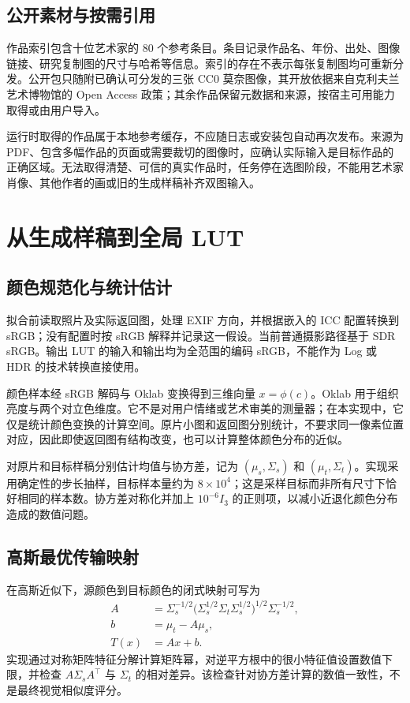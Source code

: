 \subsection{公开素材与按需引用}
作品索引包含十位艺术家的 80 个参考条目。条目记录作品名、年份、出处、图像链接、研究复制图的尺寸与哈希等信息。索引的存在不表示每张复制图均可重新分发。公开包只随附已确认可分发的三张 CC0 莫奈图像，其开放依据来自克利夫兰艺术博物馆的 Open Access 政策\cite{cma}；其余作品保留元数据和来源，按宿主可用能力取得或由用户导入。

运行时取得的作品属于本地参考缓存，不应随日志或安装包自动再次发布。来源为 PDF、包含多幅作品的页面或需要裁切的图像时，应确认实际输入是目标作品的正确区域。无法取得清楚、可信的真实作品时，任务停在选图阶段，不能用艺术家肖像、其他作者的画或旧的生成样稿补齐双图输入。

\section{从生成样稿到全局 LUT}
\subsection{颜色规范化与统计估计}
拟合前读取照片及实际返回图，处理 EXIF 方向，并根据嵌入的 ICC 配置转换到 sRGB；没有配置时按 sRGB 解释并记录这一假设。当前普通摄影路径基于 SDR sRGB。输出 LUT 的输入和输出均为全范围的编码 sRGB，不能作为 Log 或 HDR 的技术转换直接使用。

颜色样本经 sRGB 解码与 Oklab 变换得到三维向量 $x=\phi(c)$。Oklab 用于组织亮度与两个对立色维度\cite{oklab}。它不是对用户情绪或艺术审美的测量器；在本实现中，它仅是统计颜色变换的计算空间。原片小图和返回图分别统计，不要求同一像素位置对应，因此即使返回图有结构改变，也可以计算整体颜色分布的近似。

对原片和目标样稿分别估计均值与协方差，记为 $(\mu_s,\Sigma_s)$ 和 $(\mu_t,\Sigma_t)$。实现采用确定性的步长抽样，目标样本量约为 $8\times10^4$；这是采样目标而非所有尺寸下恰好相同的样本数。协方差对称化并加上 $10^{-6}I_3$ 的正则项，以减小近退化颜色分布造成的数值问题。

\subsection{高斯最优传输映射}
在高斯近似下，源颜色到目标颜色的闭式映射可写为\cite{pitie}
\begin{align}
 A &= \Sigma_s^{-1/2}
       \bigl(\Sigma_s^{1/2}\Sigma_t\Sigma_s^{1/2}\bigr)^{1/2}
       \Sigma_s^{-1/2},\label{eq:transport}\\
 b &= \mu_t-A\mu_s,\\
 T(x)&=Ax+b.
\end{align}
实现通过对称矩阵特征分解计算矩阵幂，对逆平方根中的很小特征值设置数值下限，并检查 $A\Sigma_sA^\top$ 与 $\Sigma_t$ 的相对差异。该检查针对协方差计算的数值一致性，不是最终视觉相似度评分。

